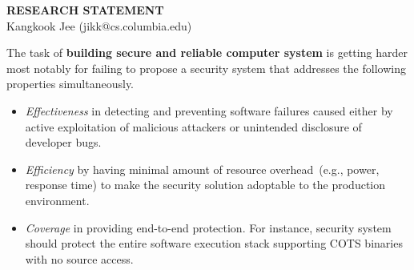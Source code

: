 \documentclass[letterpaper, 10pt]{article}
\begin{document}
\thispagestyle{fancy}

\lhead{}
\rhead{}

\renewcommand{\headrulewidth}{0pt} \renewcommand{\footrulewidth}{0pt}
\fancyfoot[C]{\footnotesize
\textcolor{gray}{http://www.cs.columbia.edu/$\sim$jikk/application}}

\pagestyle{fancy}
\lhead{\textcolor{gray}{\it Kangkook Jee}}
\rhead{\textcolor{gray}{\thepage /\pageref{LastPage}}}

\def\libdft{libdft\xspace}
\def\TFAFull{Taint Flow Algebra\xspace}
\def\TFA{TFA\xspace}
\def\SR{ShadowReplica\xspace}
\def\ie{i.e.,\xspace}

\newif \ifcomments

\ifcomments
\newcommand{\jikk}[1]{{---\textcolor{red}{#1}---}}
\else
\newcommand{\jikk}[1]{}
\fi
%

\begin{center}
{\LARGE \bf RESEARCH STATEMENT}\\
\vspace*{0.1cm}
{\normalsize Kangkook Jee (jikk@cs.columbia.edu)}
\end{center}

The task of {\bf building secure and reliable computer system} is getting
harder most notably for failing to propose a security system that addresses the
following properties simultaneously.

\begin{itemize}

        \item {\it Effectiveness} in detecting and preventing software failures
                caused either by active exploitation of malicious attackers or
                unintended disclosure of developer bugs.

        \item {\it Efficiency} by having minimal amount of resource
                overhead~(e.g., power, response time) to make the security
                solution adoptable to the production environment.

        \item {\it Coverage} in providing end-to-end protection. For instance,
                security system should protect the entire software execution
                stack supporting COTS binaries with no source access.

\end{itemize}
\end{document}
